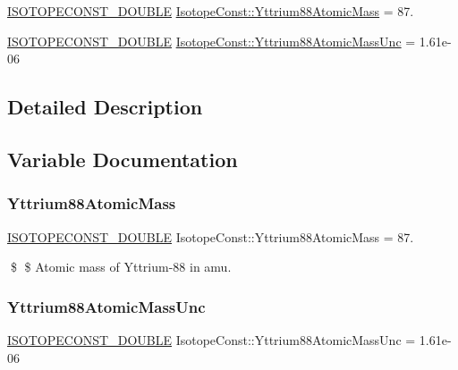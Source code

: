 \begin{DoxyCompactItemize}
\item 
\mbox{\hyperlink{group___isotope_const-_macros_ga8f45a7272ce02c0b4c65c44636ed719a}{I\+S\+O\+T\+O\+P\+E\+C\+O\+N\+S\+T\+\_\+\+D\+O\+U\+B\+LE}} \mbox{\hyperlink{group___isotope_const-_yttrium-_y88_gaa52c9570f9f2b74c9df4bf817ebd74f5}{Isotope\+Const\+::\+Yttrium88\+Atomic\+Mass}} = 87.
\item 
\mbox{\hyperlink{group___isotope_const-_macros_ga8f45a7272ce02c0b4c65c44636ed719a}{I\+S\+O\+T\+O\+P\+E\+C\+O\+N\+S\+T\+\_\+\+D\+O\+U\+B\+LE}} \mbox{\hyperlink{group___isotope_const-_yttrium-_y88_ga3e48b69591a79c1733d9f889f6b0ab9e}{Isotope\+Const\+::\+Yttrium88\+Atomic\+Mass\+Unc}} = 1.\+61e-\/06
\end{DoxyCompactItemize}


\subsection{Detailed Description}


\subsection{Variable Documentation}
\mbox{\label{group___isotope_const-_yttrium-_y88_gaa52c9570f9f2b74c9df4bf817ebd74f5}} 
\subsubsection{\texorpdfstring{Yttrium88\+Atomic\+Mass}{Yttrium88AtomicMass}}
{\footnotesize\ttfamily \mbox{\hyperlink{group___isotope_const-_macros_ga8f45a7272ce02c0b4c65c44636ed719a}{I\+S\+O\+T\+O\+P\+E\+C\+O\+N\+S\+T\+\_\+\+D\+O\+U\+B\+LE}} Isotope\+Const\+::\+Yttrium88\+Atomic\+Mass = 87.}

\$ \$ Atomic mass of Yttrium-\/88 in amu. \mbox{\label{group___isotope_const-_yttrium-_y88_ga3e48b69591a79c1733d9f889f6b0ab9e}} 
\subsubsection{\texorpdfstring{Yttrium88\+Atomic\+Mass\+Unc}{Yttrium88AtomicMassUnc}}
{\footnotesize\ttfamily \mbox{\hyperlink{group___isotope_const-_macros_ga8f45a7272ce02c0b4c65c44636ed719a}{I\+S\+O\+T\+O\+P\+E\+C\+O\+N\+S\+T\+\_\+\+D\+O\+U\+B\+LE}} Isotope\+Const\+::\+Yttrium88\+Atomic\+Mass\+Unc = 1.\+61e-\/06}

